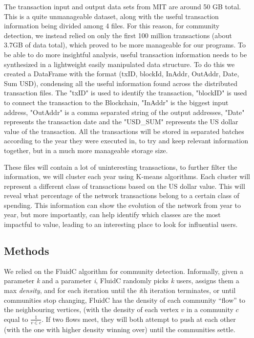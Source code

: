 \documentclass{article}
\begin{document}
The transaction input and output data sets from MIT are around 50 GB total. 
This is a quite unmanageable dataset, along with the useful transaction information being 
divided among 4 files. For this reason, for community detection, we instead 
relied on only the first 100 million transactions (about 3.7GB of data total), which 
proved to be more manageable for our programs. To be able to do more insightful analysis,
useful transaction information needs to be synthesized in a lightweight easily manipulated
data structure. To do this we created a DataFrame with the format (txID, blockId, InAddr, OutAddr, Date, Sum USD),
condensing all the useful information found across the distributed transaction files. The "txID" is used to identify
the transaction, "blockID" is used to connect the transaction to the Blockchain, "InAddr" is
the biggest input address, "OutAddr" is a comma separated string of the output addresses, 
"Date" represents the transaction date and the "USD_SUM" represents the US dollar value of the transaction.
All the transactions will be stored in separated batches according to the year they were executed in, to
try and keep relevant information together, but in a much more manageable storage size.
  
These files will contain a lot of uninteresting transactions, to further filter the information,
we will cluster each year using K-means algorithms. Each cluster will represent a different class of 
transactions based on the US dollar value. This will reveal what percentage of the network transactions
belong to a certain class of spending. This information can show the evolution of the network from
year to year, but more importantly, can help identify which classes are the most impactful to value, leading
to an interesting place to look for influential users.
  
\subsection{Methods}

We relied on the FluidC algorithm \cite{fluid} for community detection. Informally, 
given a parameter \textit{k} and a parameter \textit{i}, FluidC randomly picks \textit{k} 
users, assigns them a max \textit{density}, and for each iteration until the \textit{i}th 
iteration terminates, or until communities stop changing, FluidC has the density of each 
community ``flow'' to the neighbouring vertices, (with the density of each vertex $v$ in a 
community $c$ equal to $\frac{1}{v\in c}$. If two flows meet, they will both attempt to push 
at each other (with the one with higher density winning over) until the communities settle.
\end{document}
